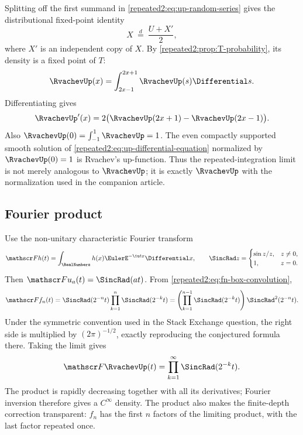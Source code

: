 \documentclass[11pt,oneside]{article}
\theoremstyle{definition}
\theoremstyle{remark}
\begin{document}
Splitting off the first summand in \eqref{repeated2:eq:up-random-series} gives the distributional
fixed-point identity
\begin{equation}
 X\ \stackrel{d}{=}\ \frac{U+X'}2,
 \label{repeated2:eq:up-fixed-point-random}
\end{equation}
where $X'$ is an independent copy of $X$.  By \cref{repeated2:prop:T-probability}, its density is a
fixed point of $T$:
\begin{equation}
 \RvachevUp(x)=\int_{2x-1}^{2x+1}\RvachevUp(s)\Differential s.
 \label{repeated2:eq:up-fixed-point-integral}
\end{equation}
Differentiating gives
\begin{equation}
 \RvachevUp'(x)=2\bigl(\RvachevUp(2x+1)-\RvachevUp(2x-1)\bigr).
 \label{repeated2:eq:up-differential-equation}
\end{equation}
Also $\RvachevUp(0)=\int_{-1}^{1}\RvachevUp=1$.  The even compactly supported smooth solution of
\eqref{repeated2:eq:up-differential-equation} normalized by $\RvachevUp(0)=1$ is Rvachev's up-function.
Thus the repeated-integration limit is not merely analogous to $\RvachevUp$; it is exactly $\RvachevUp$
with the normalization used in the companion article.

\subsection{Fourier product}

Use the non-unitary characteristic Fourier transform
\begin{equation}
 \mathscr F h(t)=\int_{\RealNumbers}h(x)\EulerE^{-\iu tx}\Differential x,
 \qquad \SincRad z=\begin{cases}\sin z/z,&z\ne0,\\1,&z=0.\end{cases}
 \label{repeated2:eq:fourier-convention}
\end{equation}
Then $\mathscr F u_a(t)=\SincRad(at)$.  From \eqref{repeated2:eq:fn-box-convolution},
\begin{equation}
 \mathscr F f_n(t)
 =\SincRad(2^{-n}t)\prod_{k=1}^{n}\SincRad(2^{-k}t)
 =\left(\prod_{k=1}^{n-1}\SincRad(2^{-k}t)\right)\SincRad^2(2^{-n}t).
 \label{repeated2:eq:finite-fourier-product}
\end{equation}
Under the symmetric convention used in the Stack Exchange question, the right side is
multiplied by $(2\pi)^{-1/2}$, exactly reproducing the conjectured formula there.
Taking the limit gives
\begin{equation}
 \mathscr F\RvachevUp(t)=\prod_{k=1}^{\infty}\SincRad(2^{-k}t).
 \label{repeated2:eq:up-fourier-product}
\end{equation}
The product is rapidly decreasing together with all its derivatives; Fourier inversion
therefore gives a $C^\infty$ density.  The product also makes the finite-depth correction
transparent: $f_n$ has the first $n$ factors of the limiting product, with the last factor
repeated once.
\end{document}
